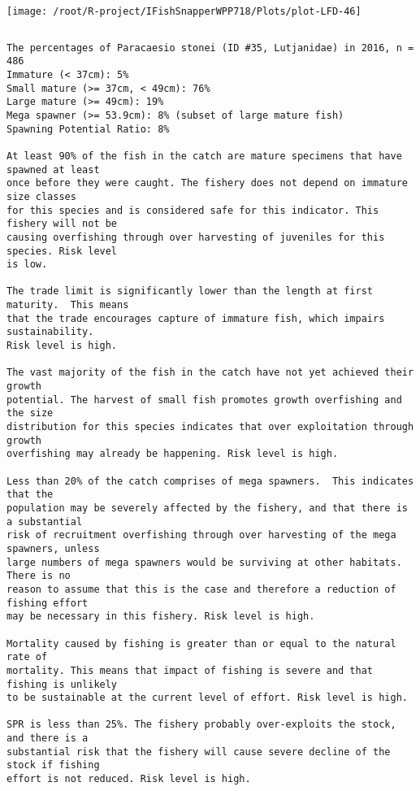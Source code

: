\documentclass{report}\usepackage[]{graphicx}\usepackage[]{color}
\makeatletter
\def\maxwidth{ %
  \ifdim\Gin@nat@width>\linewidth
    \linewidth
  \else
    \Gin@nat@width
  \fi
}
\newenvironment{kframe}{%
 \def\at@end@of@kframe{}%
 \ifinner\ifhmode%
  \def\at@end@of@kframe{\end{minipage}}%
  \begin{minipage}{\columnwidth}%
 \fi\fi%
 \def\FrameCommand##1{\hskip\@totalleftmargin \hskip-\fboxsep
 \colorbox{shadecolor}{##1}\hskip-\fboxsep
     \hskip-\linewidth \hskip-\@totalleftmargin \hskip\columnwidth}%
 \MakeFramed {\advance\hsize-\width
   \@totalleftmargin\z@ \linewidth\hsize
   \@setminipage}}%
 {\par\unskip\endMakeFramed%
 \at@end@of@kframe}
\newenvironment{knitrout}{}{} %
\makeatother
\begin{document}
\begin{knitrout}
\texttt{[image: /root/R-project/IFishSnapperWPP718/Plots/plot-LFD-46]} 
\begin{kframe}\begin{verbatim}
\end{verbatim}
\end{kframe}
\clearpage
\newpage
\begin{kframe}\begin{verbatim}The percentages of Paracaesio stonei (ID #35, Lutjanidae) in 2016, n = 486
Immature (< 37cm): 5%
Small mature (>= 37cm, < 49cm): 76%
Large mature (>= 49cm): 19%
Mega spawner (>= 53.9cm): 8% (subset of large mature fish)
Spawning Potential Ratio: 8%
 
At least 90% of the fish in the catch are mature specimens that have spawned at least
once before they were caught. The fishery does not depend on immature size classes
for this species and is considered safe for this indicator. This fishery will not be
causing overfishing through over harvesting of juveniles for this species. Risk level
is low.

The trade limit is significantly lower than the length at first maturity.  This means
that the trade encourages capture of immature fish, which impairs sustainability.
Risk level is high.

The vast majority of the fish in the catch have not yet achieved their growth
potential. The harvest of small fish promotes growth overfishing and the size
distribution for this species indicates that over exploitation through growth
overfishing may already be happening. Risk level is high.

Less than 20% of the catch comprises of mega spawners.  This indicates that the
population may be severely affected by the fishery, and that there is a substantial
risk of recruitment overfishing through over harvesting of the mega spawners, unless
large numbers of mega spawners would be surviving at other habitats. There is no
reason to assume that this is the case and therefore a reduction of fishing effort
may be necessary in this fishery. Risk level is high.
 
Mortality caused by fishing is greater than or equal to the natural rate of
mortality. This means that impact of fishing is severe and that fishing is unlikely
to be sustainable at the current level of effort. Risk level is high.
 
SPR is less than 25%. The fishery probably over-exploits the stock, and there is a
substantial risk that the fishery will cause severe decline of the stock if fishing
effort is not reduced. Risk level is high.
 

\end{verbatim}
\end{kframe}
\end{knitrout}
\end{document}
